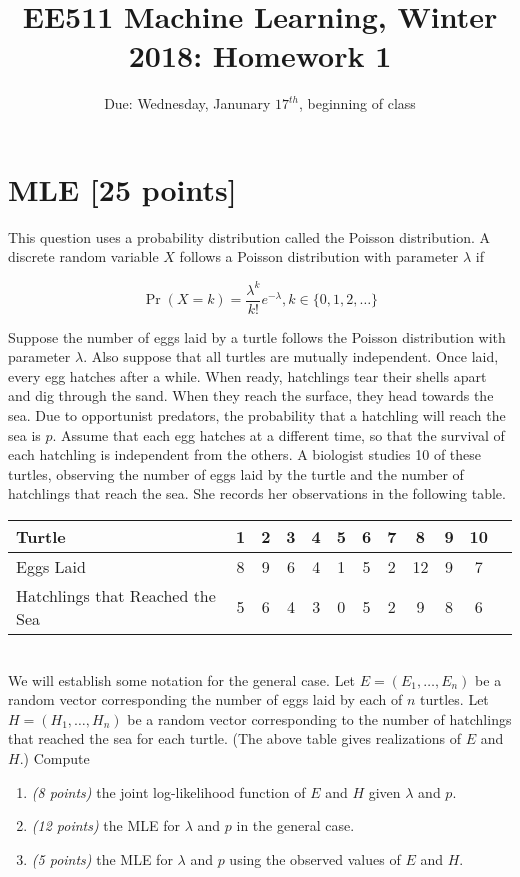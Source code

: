 \documentclass[letterpaper]{article}
\title{EE511 Machine Learning, Winter 2018: Homework 1}
\author{}
\date{Due: Wednesday, Janunary $17^{th}$, beginning of class}
\begin{document}
\maketitle

\section{MLE [25 points]}
This question uses a probability distribution called the
Poisson distribution. A discrete random variable $X$ follows
a Poisson distribution with parameter $\lambda$ if 

$$\Pr(X=k)=\frac{\lambda^k}{k!}e^{-\lambda},
k \in \{0,1,2,\dots\}$$

Suppose the number of eggs laid by a turtle follows
the Poisson distribution with parameter $\lambda$. 
Also suppose that all turtles are mutually independent.
Once laid, every egg
hatches after a while. 
When ready, hatchlings tear their shells apart and dig
through the sand. When they reach the surface, they head towards the sea. 
Due to opportunist predators, the probability that a hatchling will 
reach the sea is $p$.
Assume that each egg hatches at a different time, so that 
the survival of each hatchling is independent from the others. 
A biologist studies 10 of these turtles, observing the number of eggs 
laid by the turtle and the
number of hatchlings that reach the sea. 
She records her observations in the following table.
\\

\begin{tabular}{l*{10}{c}r}
Turtle              & 1 & 2 & 3 & 4 & 5 & 6 & 7 & 8 & 9 & 10 \\
\hline
Eggs Laid				         & 8 & 9 & 6 & 4 & 1 & 5 & 2 & 12 & 9 & 7  \\
Hatchlings that Reached the Sea  & 5 & 6 & 4 & 3 & 0 & 5 & 2 & 9 & 8 & 6 \\
\end{tabular}
\\

We will establish some notation for the general case.
Let $E=(E_1,\dots,E_n)$ be a random vector corresponding the 
number of eggs laid by each of $n$ turtles. Let $H=(H_1,\dots,H_n)$ be a random vector 
corresponding to 
the number of hatchlings that reached the sea for each turtle. 
(The above table gives realizations of $E$ and $H$.)
Compute
\begin{enumerate}
\item \emph{(8 points)} 
the joint log-likelihood function of $E$ and $H$ given $\lambda$ and $p$.
\item \emph{(12 points)} 
the MLE for $\lambda$ and $p$ in the general case.
\item \emph{(5 points)} 
the MLE for $\lambda$ and $p$ using the observed values of $E$ and $H$.
\end{enumerate}
\end{document}
